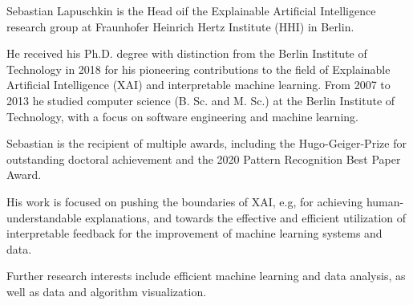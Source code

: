 
\vspace{-1.3em} %

\begin{multicols}{2}  %
\noindent

Sebastian Lapuschkin is the Head oif the Explainable Artificial Intelligence research group at Fraunhofer Heinrich Hertz Institute (HHI) in Berlin.

He received his Ph.D. degree with distinction from the Berlin Institute of Technology in 2018
for his pioneering contributions to the field of Explainable Artificial Intelligence (XAI) and interpretable machine learning.
From 2007 to 2013 he studied computer science (B. Sc. and M. Sc.) at the Berlin Institute of Technology,
with a focus on software engineering and machine learning.

Sebastian is the recipient of multiple awards, including the Hugo-Geiger-Prize for outstanding doctoral achievement and the 2020 Pattern Recognition Best Paper Award.

His work is focused on pushing the boundaries of XAI, e.g, for achieving human-understandable explanations,
and towards the effective and efficient utilization of interpretable feedback for the improvement of machine learning systems and data.

Further research interests include efficient machine learning and data analysis, as well as data and algorithm visualization.

\end{multicols}